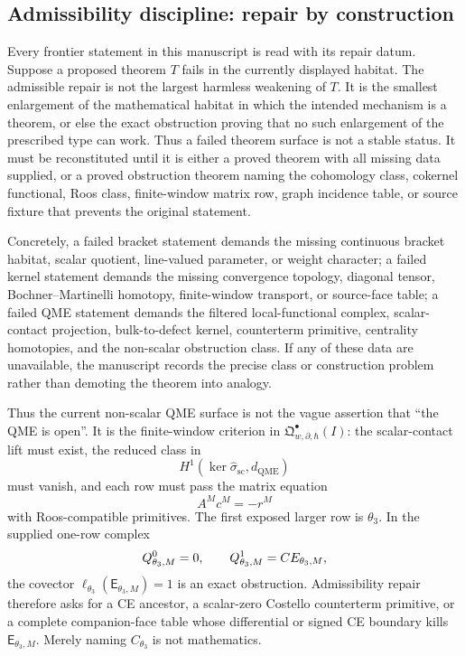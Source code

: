 \subsection{Admissibility discipline: repair by construction}

Every frontier statement in this manuscript is read with its repair datum.
Suppose a proposed theorem \(T\) fails in the currently displayed
habitat.  The admissible repair is not the largest harmless weakening of
\(T\).  It is the smallest enlargement of the mathematical habitat in
which the intended mechanism is a theorem, or else the exact obstruction
proving that no such enlargement of the prescribed type can work.
Thus a failed theorem surface is not a stable status.  It must be
reconstituted until it is either a proved theorem with all missing data
supplied, or a proved obstruction theorem naming the cohomology class,
cokernel functional, Roos class, finite-window matrix row, graph
incidence table, or source fixture that prevents the original statement.

Concretely, a failed bracket statement demands the missing continuous
bracket habitat, scalar quotient, line-valued parameter, or weight
character; a failed kernel statement demands the missing convergence
topology, diagonal tensor, Bochner--Martinelli homotopy, finite-window
transport, or source-face table; a failed QME statement demands the
filtered local-functional complex, scalar-contact projection,
bulk-to-defect kernel, counterterm primitive, centrality homotopies, and
the non-scalar obstruction class.  If any of these data are unavailable,
the manuscript records the precise class or construction problem rather
than demoting the theorem into analogy.

Thus the current non-scalar QME surface is not the vague assertion that
``the QME is open''.  It is the finite-window criterion in
\(\mathfrak Q^\bullet_{w,\partial,\hbar}(I)\): the scalar-contact lift
must exist, the reduced class in
\[
  H^1(\ker\widehat\sigma_{\mathrm{sc}},d_{\mathrm{QME}})
\]
must vanish, and each row must pass the matrix equation
\[
  A^M c^M=-r^M
\]
with Roos-compatible primitives.  The first exposed larger row is
\(\theta_3\).  In the supplied one-row complex
\[
  Q^0_{\theta_3,M}=0,\qquad
  Q^1_{\theta_3,M}=CE_{\theta_3,M},
\]
the covector \(\ell_{\theta_3}(\mathsf E_{\theta_3,M})=1\) is an exact
obstruction.  Admissibility repair therefore asks for a CE ancestor, a
scalar-zero Costello counterterm primitive, or a complete companion-face
table whose differential or signed CE boundary kills
\(\mathsf E_{\theta_3,M}\).  Merely naming \(C_{\theta_3}\) is not
mathematics.

